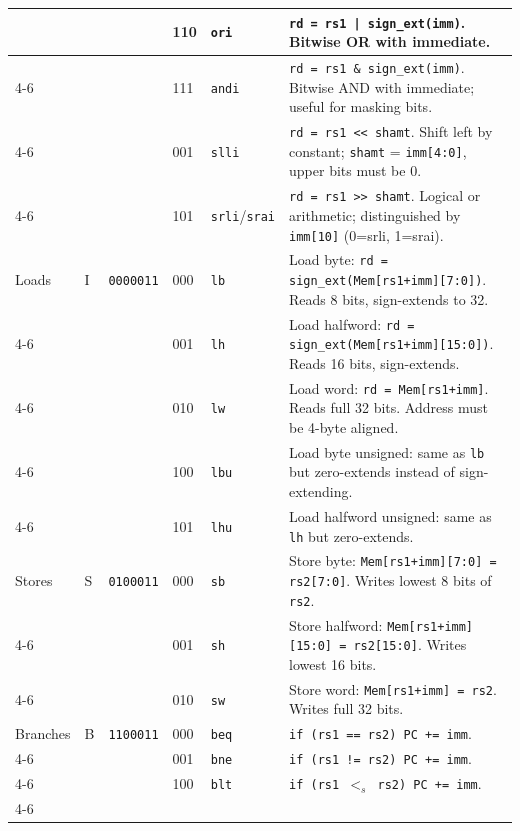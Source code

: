 \documentclass[9pt, a4paper]{extarticle}
\begin{document}
\begin{table}[htbp]
{\begin{tabular}{@{} l | l | l | l | l | p{9cm} @{}}
    & & & 110 & \texttt{ori} &
        \texttt{rd = rs1 | sign\_ext(imm)}. Bitwise OR with immediate. \\ \cline{4-6}
    & & & 111 & \texttt{andi} &
        \texttt{rd = rs1 \& sign\_ext(imm)}. Bitwise AND with immediate; useful for masking bits. \\ \cline{4-6}
    & & & 001 & \texttt{slli} &
        \texttt{rd = rs1 << shamt}. Shift left by constant; \texttt{shamt} = \texttt{imm[4:0]}, upper bits must be 0. \\ \cline{4-6}
    & & & 101 & \texttt{srli}/\texttt{srai} &
        \texttt{rd = rs1 >> shamt}. Logical or arithmetic; distinguished by \texttt{imm[10]} (0=srli, 1=srai). \\
    \midrule
    Loads & I & \texttt{0000011} & 000 & \texttt{lb} &
        Load byte: \texttt{rd = sign\_ext(Mem[rs1+imm][7:0])}. Reads 8 bits, sign-extends to 32. \\ \cline{4-6}
    & & & 001 & \texttt{lh} &
        Load halfword: \texttt{rd = sign\_ext(Mem[rs1+imm][15:0])}. Reads 16 bits, sign-extends. \\ \cline{4-6}
    & & & 010 & \texttt{lw} &
        Load word: \texttt{rd = Mem[rs1+imm]}. Reads full 32 bits. Address must be 4-byte aligned. \\ \cline{4-6}
    & & & 100 & \texttt{lbu} &
        Load byte unsigned: same as \texttt{lb} but zero-extends instead of sign-extending. \\ \cline{4-6}
    & & & 101 & \texttt{lhu} &
        Load halfword unsigned: same as \texttt{lh} but zero-extends. \\
    \midrule
    Stores & S & \texttt{0100011} & 000 & \texttt{sb} &
        Store byte: \texttt{Mem[rs1+imm][7:0] = rs2[7:0]}. Writes lowest 8 bits of \texttt{rs2}. \\ \cline{4-6}
    & & & 001 & \texttt{sh} &
        Store halfword: \texttt{Mem[rs1+imm][15:0] = rs2[15:0]}. Writes lowest 16 bits. \\ \cline{4-6}
    & & & 010 & \texttt{sw} &
        Store word: \texttt{Mem[rs1+imm] = rs2}. Writes full 32 bits. \\
    \midrule
    Branches & B & \texttt{1100011} & 000 & \texttt{beq} &
        \texttt{if (rs1 == rs2) PC += imm}. \\ \cline{4-6}
    & & & 001 & \texttt{bne} &
        \texttt{if (rs1 != rs2) PC += imm}. \\ \cline{4-6}
    & & & 100 & \texttt{blt} &
        \texttt{if (rs1 $<_s$ rs2) PC += imm}. \\ \cline{4-6}

\end{tabular}}
\end{table}
\end{document}

